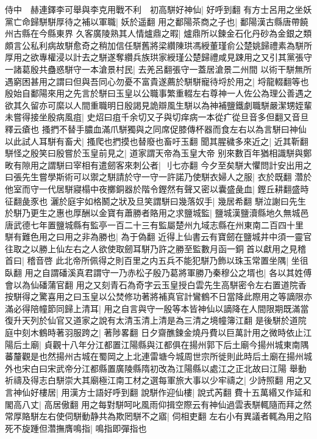 侍中　赫連鐸李可舉與李克用戰不利　初高駢好神仙|{
	好呼到翻}
有方士呂用之坐妖黨亡命歸駢駢厚待之補以軍職|{
	妖於遥翻}
用之鄱陽茶商之子也|{
	鄱陽漢古縣唐帶饒州古縣在今縣東界}
久客廣陵熟其人情爐鼎之暇|{
	爐鼎所以鍊金石化丹砂為金銀之類}
頗言公私利病故駢愈奇之稍加信任駢舊將梁纘陳珙馮綬董瑾俞公楚姚歸禮素為駢所厚用之欲專權浸以計去之駢遂奪纘兵族珙家綬瑾公楚歸禮咸見踈用之又引其黨張守一諸葛殷共蠱惑駢守一本滄景村民|{
	去羌呂翻張守一蓋居滄景二州間}
以術干駢無所遇窮困甚用之謂曰但與吾同心勿憂不富貴遂薦於駢駢寵待埒於用之|{
	埒龍輟翻等也}
殷始自鄱陽來用之先言於駢曰玉皇以公職事繁重輟左右尊神一人佐公為理公善遇之欲其久留亦可縻以人間重職明日殷謁見詭辯風生駢以為神補鹽鐵劇職駢嚴潔甥姪輩未嘗得接坐殷病風疽|{
	史炤曰疽千余切又子與切痒病一本從疒從旦音多但翻又音旦釋云瘡也}
搔捫不替手膿血滿爪駢獨與之同席促膝傳杯器而食左右以為言駢曰神仙以此試人耳駢有畜犬|{
	搔爬也捫摸也替廢也畜吁玉翻}
聞其腥穢多來近之|{
	近其靳翻}
駢怪之殷笑曰殷嘗於玉皇前見之|{
	道家謂天帝為玉皇大帝}
别來數百年猶相識駢與鄭畋有隙用之謂駢曰宰相有遣劒客來刺公者|{
	刂七亦翻}
今夕至矣駢大懼問計安出用之曰張先生嘗學斯術可以禦之駢請於守一守一許諾乃使駢衣婦人之服|{
	衣於既翻}
濳於他室而守一代居駢寢榻中夜擲銅器於階令鏗然有聲又密以囊盛彘血|{
	鏗丘耕翻盛時征翻彘豕也}
灑於庭宇如格鬭之狀及旦笑謂駢曰幾落奴手|{
	幾居希翻}
駢泣謝曰先生於駢乃更生之惠也厚酬以金寶有蕭勝者賂用之求鹽城監|{
	鹽城漢鹽瀆縣地久無城邑唐武德七年置鹽城縣有監亭一百二十三有監屬楚州九域志縣在州東南二百四十里}
駢有難色用之曰用之非為勝也|{
	為于偽翻}
近得上仙書云有寶劒在鹽城井中須一靈官往取之以勝上仙左右之人欲使取劒耳駢乃許之勝至監數月函一銅首以獻用之見稽首曰|{
	稽音啓}
此北帝所佩得之則百里之内五兵不能犯駢乃飾以珠玉常置坐隅|{
	坐徂臥翻}
用之自謂磻溪真君謂守一乃赤松子殷乃葛將軍勝乃秦穆公之壻也|{
	各以其姓傅會以為仙磻蒲官翻}
用之又刻青石為奇字云玉皇授白雲先生高駢密令左右置道院香按駢得之驚喜用之曰玉皇以公焚修功著將補真官計鸞鶴不日當降此際用之等謫限亦滿必得陪幢節同歸上清耳|{
	用之自言與守一殷等本皆神仙以謫降在人間限期既滿當復升天列於仙官又道家之說有太清玉清上清是為三清之境幢簿江翻}
是後駢於道院庭中刻木鶴時著羽服跨之|{
	著陟畧翻}
日夕齋醮鍊金燒丹費以巨萬計用之微時依止江陽后土廟|{
	貞觀十八年分江都置江陽縣與江都俱在揚州郭下后土廟今揚州城東南隅蕃釐觀是也然揚州古城在蜀岡之上北連雷塘今城周世宗所徙則此時后土廟在揚州城外也宋白曰宋武帝分江都縣置廣陵縣隋初改為江陽縣以處江之正北故曰江陽}
舉動祈禱及得志白駢崇大其廟極江南工材之選每軍旅大事以少牢禱之|{
	少詩照翻}
用之又言神仙好樓居|{
	用漢方士語好呼到翻}
說駢作迎仙樓|{
	說式芮翻}
費十五萬緡又作延和閣高八丈|{
	高居傲翻}
用之每對駢呵叱風雨仰揖空際云有神仙過雲表駢輒隨而拜之然常厚賂駢左右使伺駢動静共為欺罔駢不之寤|{
	伺相吏翻}
左右小有異議者輒為用之陷死不旋踵但濳撫膺鳴指|{
	鳴指即彈指也}
